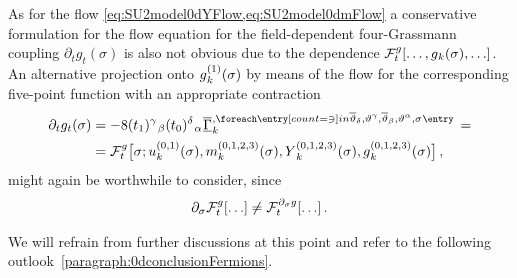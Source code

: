 As for the flow \cref{eq:SU2model0dYFlow,eq:SU2model0dmFlow} a conservative formulation for the flow equation for the field-dependent four-Grassmann coupling $\partial_t g_t(\sigma)$ is also not obvious due to the dependence $\FRGflow_t^g[\ldots,\FScoupling{g}{0}{\sigma},\ldots]$.
An alternative projection onto $\FScoupling{g}{1}{\sigma}$ by means of the flow for the corresponding five-point function with an appropriate contraction
\begin{align}
\partial_t g_t(\sigma)&=%
-8\suIItij{1}{\gamma}{\beta} \suIItij{0}{\delta}{\alpha}\vts\FSvertexArg{\FSeaaEoM}{\overline{\vartheta} {}_{{\delta}},{\vartheta} \text{}^{{\gamma}},\overline{\vartheta} {}_{{\beta}},{\vartheta} \text{}^{{\alpha}},\sigma}\,=\notag\\*[,1em] %
&=\FRGflow_t^g\big[\sigma;\FScoupling{u}{0,1}{\sigma},\FScoupling{m}{0,1,2,3}{\sigma},\FScoupling{Y}{0,1,2,3}{\sigma},\FScoupling{g}{0,1,2,3}{\sigma}\big]\label{eq:SU2model0dh1Flow}\,,
\end{align}
might again be worthwhile to consider, since
\begin{align}
\partial_\sigma\mathcal{F}_t^{g}[\ldots]\neq\mathcal{F}_t^{\mskip1.0mu \partial_\sigma g}[\ldots]\,.
\end{align}

We will refrain from further discussions at this point and refer to the following outlook~\ref{paragraph:0dconclusionFermions}.
\renewcommand{\FSk}{k}